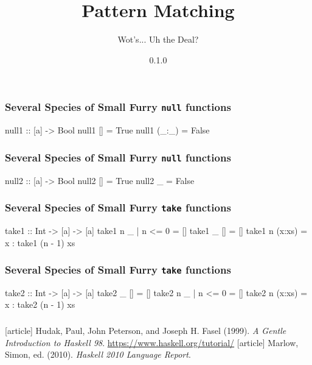 \documentclass{beamer}
\title{Pattern Matching}
\subtitle{Wot's... Uh the Deal?}
\author{}
\institute{Stack Builders}
\date{0.1.0}
\begin{document}
\frame{\titlepage}

\begin{frame}[fragile]
  \frametitle{Several Species of Small Furry \texttt{null} functions}

  \begin{code}
null1 :: [a] -> Bool
null1 []    = True
null1 (_:_) = False
  \end{code}
\end{frame}

\begin{frame}[fragile]
  \frametitle{Several Species of Small Furry \texttt{null} functions}

  \begin{code}
null2 :: [a] -> Bool
null2 []    = True
null2 _     = False
  \end{code}
\end{frame}

\begin{frame}[fragile]
  \frametitle{Several Species of Small Furry \texttt{take} functions}

  \begin{code}
take1 :: Int -> [a] -> [a]
take1 n _      | n <= 0 = []
take1 _ []              = []
take1 n (x:xs)          = x : take1 (n - 1) xs
  \end{code}
\end{frame}

\begin{frame}[fragile]
  \frametitle{Several Species of Small Furry \texttt{take} functions}

  \begin{code}
take2 :: Int -> [a] -> [a]
take2 _ []              = []
take2 n _      | n <= 0 = []
take2 n (x:xs)          = x : take2 (n - 1) xs
  \end{code}
\end{frame}

\begin{frame}
  \frametitle{}

  \begin{thebibliography}{}
  [article]
    Hudak, Paul, John Peterson, and Joseph H. Fasel (1999).
    \newblock \emph{A Gentle Introduction to Haskell 98}.
    \newblock \url{https://www.haskell.org/tutorial/}
  [article]
    Marlow, Simon, ed. (2010).
    \newblock \emph{Haskell 2010 Language Report}.
  \end{thebibliography}
\end{frame}
\end{document}
